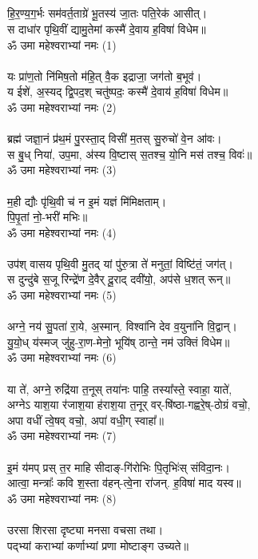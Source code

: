 \subsection{}
हि॒र॒ण्य॒ग॒र्भः सम॑वर्त॒ताग्रे॑ भू॒तस्य॑ जा॒तः पति॒रेक॑ आसीत्।\\
स दाधा॑र पृथि॒वीं द्यामु॒तेमां कस्मै॑ दे॒वाय ह॒विषा॑ विधेम॥\\
ॐ उमा महेश्वराभ्यां नमः     (1)\\
\\
यः प्रा॑ण॒तो नि॑मिष॒तो म॑हि॒त् वै॒क इद्राजा॒ जग॑तो ब॒भूव॑।\\
य ईशे॑, अ॒स्यद् द्वि॒पद॒श् चतु॑ष्पदः॒ कस्मै॑ दे॒वाय॑ ह॒विषा॑ विधेम॥\\
ॐ उमा महेश्वराभ्यां नमः     (2)\\
\\
ब्रह्म॑ जज्ञा॒नं प्र॑थ॒मं पु॒रस्ता॒द् विसी॑ म॒तस् सु॒रुचो॑ वे॒न आ॑वः।\\
स बु॒ध् निया॑, उप॒मा, अ॑स्य वि॒ष्टास् स॒तश्च॒ यो॒नि मस॑ तश्च॒ विवः॑॥\\
ॐ उमा महेश्वराभ्यां नमः     (3)\\
\\
म॒ही द्यौः पृ॑थि॒वी च॑ न इ॒मं यज्ञं मि॑मिक्षताम्।\\
पि॒पृ॒तां नो॒-भरी॑ मभिः॥\\
ॐ उमा महेश्वराभ्यां नमः     (4)\\
\\
उप॑श् वासय पृथि॒वी मु॒तद् यां पु॑रु॒त्रा ते॑ मनुतां॒ विष्टि॑तं॒ जग॑त्।\\
स दुन्दु॑बे स॒जू रिन्द्रे॑ण दे॒वैर् दू॒राद् दवी॑यो॒, अप॑से ध॒शत् रून्॥\\
ॐ उमा महेश्वराभ्यां नमः     (5)\\
\\
अग्ने॒ नय॑ सु॒पता॑ रा॒ये, अ॒स्मान्. विश्वा॑नि देव व॒युना॑नि वि॒द्वान्।\\
यु॒यो॒ध् य॑स्मज् जु॑हु-रा॒ण-मेनो॒ भूयि॑ष् ठान्ते॒ नम॑ उक्तिं विधेम॥\\
ॐ उमा महेश्वराभ्यां नमः     (6)\\
 \\
या ते॑, अग्ने॒ रुद्रि॑या त॒नूस् तया॑नः पाहि॒ तस्या᳚स्ते॒ स्वाहा॒ याते॑,\\
अग्नेऽ याश॒या र॑जाश॒या ह॑राश॒या त॒नूर् वर्-षि॑ष्ठा-गह्वरे॒ष्-ठोग्रं वचो॒,\\
अपा वधीं त्वे॒षव् वचो॒, अपा॑ वधी॒ग् स्वाहा᳚॥   \\
ॐ उमा महेश्वराभ्यां नमः     (7)\\
\\
इ॒मं य॑मप् प्रस् त॒र माहि सीदाङ्-गि॑रोभिः पि॒तृभिः॑स् संविदा॒नः।\\
आत्वा॒ मन्त्राः᳚ कवि श॒स्ता व॑हन्-त्वे॒ना रा॑जन्. ह॒विषा॑ माद यस्व॥\\
ॐ उमा महेश्वराभ्यां नमः     (8)\\
\\
उरसा शिरसा दृष्ट्या मनसा वचसा तथा।\\
पद्भ्यां  कराभ्यां कर्णाभ्यां प्रणा मोष्टाङ्ग उच्यते॥\\
\\
